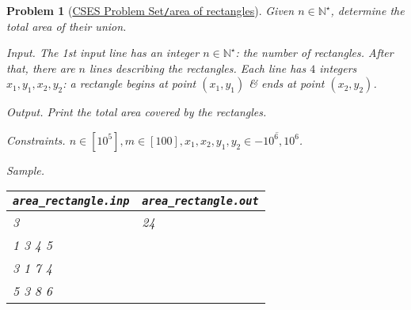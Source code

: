 \documentclass{article}
\newtheorem{problem}{Problem}
\begin{document}
\begin{problem}[\href{https://cses.fi/problemset/task/1741}{CSES Problem Set{\tt/}area of rectangles}]
    Given $n\in\mathbb{N}^\star$, determine the total area of their union.
    \item {\sf Input.} The 1st input line has an integer $n\in\mathbb{N}^\star$: the number of rectangles. After that, there are $n$ lines describing the rectangles. Each line has $4$ integers $x_1,y_1,x_2,y_2$: a rectangle begins at point $(x_1,y_1)$ \& ends at point $(x_2,y_2)$.
    \item {\sf Output.} Print the total area covered by the rectangles.
    \item {\sf Constraints.} $n\in[10^5],m\in[100],x_1,x_2,y_1,y_2\in\overline{-10^6,10^6}$.
    \item {\sf Sample.}
    \begin{table}[H]
        \centering
        \begin{tabular}{|l|l|}
            \hline
            \verb|area_rectangle.inp| & \verb|area_rectangle.out| \\
            \hline
            3 & 24 \\
            1 3 4 5 & \\
            3 1 7 4 & \\
            5 3 8 6 & \\
            \hline
        \end{tabular}
    \end{table}
\end{problem}
\end{document}
